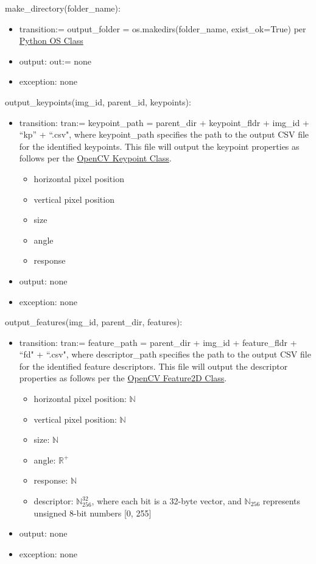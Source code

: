 \documentclass[12pt, titlepage]{article}
\begin{document}
  \noindent make\_directory(folder\_name):
  \begin{itemize}
  \item transition:= output\_folder = os.makedirs(folder\_name, exist\_ok=True) per \href{https://docs.python.org/3/library/os.html}{Python OS Class}
  \item output: out:= none
  \item exception: none 
  \end{itemize}  

  \noindent output\_keypoints(img\_id, parent\_id, keypoints):
  \begin{itemize}
    \item transition: tran:= keypoint\_path = parent\_dir + keypoint\_fldr + img\_id + ``kp'' + ``.csv", where keypoint\_path specifies the 
    path to the output CSV file for the identified keypoints. This file will output the keypoint properties as follows per the 
    \href{https://docs.opencv.org/3.4/d2/d29/classcv_1_1KeyPoint.html}{OpenCV Keypoint Class}.
  
    \begin{itemize}
      \item horizontal pixel position
      \item vertical pixel position
      \item size 
      \item angle
      \item response 
    \end{itemize}
  \item output: none 
  \item exception: none 
  \end{itemize}
  
  
  \noindent output\_features(img\_id, parent\_dir, features):
  \begin{itemize}
    \item transition: tran:= feature\_path = parent\_dir + img\_id + feature\_fldr + ``fd" + ``.csv", where descriptor\_path specifies the 
    path to the output CSV file for the identified feature descriptors. This file will output the descriptor properties 
    as follows per the \href{https://docs.opencv.org/4.x/d0/d13/classcv_1_1Feature2D.html}{OpenCV Feature2D Class}.
    \begin{itemize}
      \item horizontal pixel position: $\mathbb{N}$
      \item vertical pixel position: $\mathbb{N}$
      \item size: $\mathbb{N}$
      \item angle: $\mathbb{R}^{+}$
      \item response: $\mathbb{N}$
      \item descriptor: $\mathbb{N}_{256}^{32}$, where each bit is a 32-byte vector, and 
      $\mathbb{N}_{256}$ represents unsigned 8-bit numbers [0, 255]
    \end{itemize}
  \item output: none 
  \item exception: none 
  \end{itemize}
  
\end{document}
